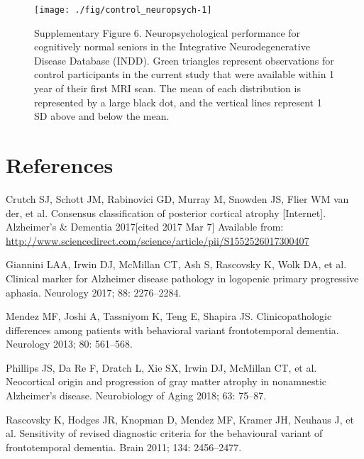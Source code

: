 \documentclass[]{article}
\begin{document}
\begin{figure}

{\centering \texttt{[image: ./fig/control\_neuropsych-1]} 

}

\caption{Supplementary Figure 6. Neuropsychological performance for cognitively normal seniors in the Integrative Neurodegenerative Disease Database (INDD). Green triangles represent observations for control participants in the current study that were available within 1 year of their first MRI scan. The mean of each distribution is represented by a large black dot, and the vertical lines represent 1 SD above and below the mean.}\label{fig:control_neuropsych}
\end{figure}

\section*{References}\label{references}

\hypertarget{refs}{}
\hypertarget{ref-crutch_consensus_2017}{}
Crutch SJ, Schott JM, Rabinovici GD, Murray M, Snowden JS, Flier WM van
der, et al. Consensus classification of posterior cortical atrophy
{[}Internet{]}. Alzheimer's \& Dementia 2017{[}cited 2017 Mar 7{]}
Available from:
\url{http://www.sciencedirect.com/science/article/pii/S1552526017300407}

\hypertarget{ref-giannini_clinical_2017}{}
Giannini LAA, Irwin DJ, McMillan CT, Ash S, Rascovsky K, Wolk DA, et al.
Clinical marker for Alzheimer disease pathology in logopenic primary
progressive aphasia. Neurology 2017; 88: 2276--2284.

\hypertarget{ref-mendez_clinicopathologic_2013}{}
Mendez MF, Joshi A, Tassniyom K, Teng E, Shapira JS. Clinicopathologic
differences among patients with behavioral variant frontotemporal
dementia. Neurology 2013; 80: 561--568.

\hypertarget{ref-phillips_neocortical_2018}{}
Phillips JS, Da Re F, Dratch L, Xie SX, Irwin DJ, McMillan CT, et al.
Neocortical origin and progression of gray matter atrophy in nonamnestic
Alzheimer's disease. Neurobiology of Aging 2018; 63: 75--87.

\hypertarget{ref-rascovsky_sensitivity_2011}{}
Rascovsky K, Hodges JR, Knopman D, Mendez MF, Kramer JH, Neuhaus J, et
al. Sensitivity of revised diagnostic criteria for the behavioural
variant of frontotemporal dementia. Brain 2011; 134: 2456--2477.
\end{document}
